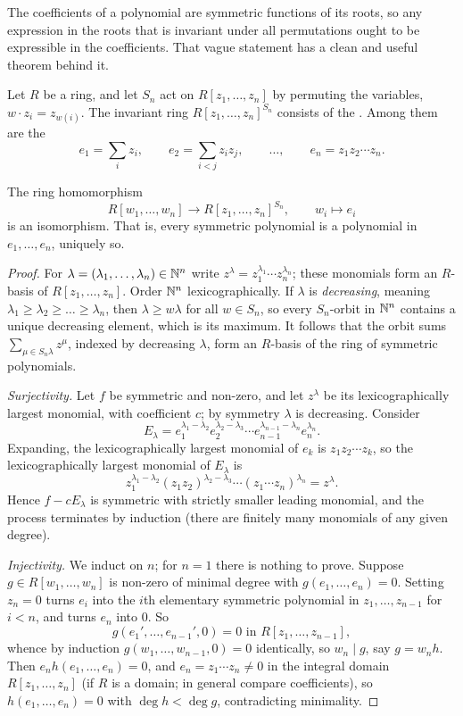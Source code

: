 \documentclass[a4paper]{scrartcl}
\begin{document}
The coefficients of a polynomial are symmetric functions of its roots, so any expression in the roots that is invariant under all permutations ought to be expressible in the coefficients. That vague statement has a clean and useful theorem behind it.

Let $R$ be a ring, and let $S_n$ act on $R[z_1,\dots,z_n]$ by permuting the variables, $w \cdot z_i = z_{w(i)}$. The invariant ring $R[z_1,\dots,z_n]^{S_n}$ consists of the . Among them are the 
$$e_1 = \sum_i z_i, \qquad e_2 = \sum_{i<j}z_iz_j, \qquad \dots, \qquad e_n = z_1z_2\cdots z_n.$$

\begin{theorem}\label{thm:symm}
	The ring homomorphism
	$$R[w_1,\dots,w_n] \to R[z_1,\dots,z_n]^{S_n}, \qquad w_i \mapsto e_i$$
	is an isomorphism. That is, every symmetric polynomial is a polynomial in $e_1,\dots,e_n$, uniquely so.
\end{theorem}

\begin{proof}
	For $\lambda = (\lambda_1,\dots,\lambda_n) \in \mathbb{N}^n$ write $z^\lambda = z_1^{\lambda_1}\cdots z_n^{\lambda_n}$; these monomials form an $R$-basis of $R[z_1,\dots,z_n]$. Order $\mathbb{N}^n$ lexicographically. If $\lambda$ is \emph{decreasing}, meaning $\lambda_1 \geq \lambda_2 \geq \dots \geq \lambda_n$, then $\lambda \geq w\lambda$ for all $w \in S_n$, so every $S_n$-orbit in $\mathbb{N}^n$ contains a unique decreasing element, which is its maximum. It follows that the orbit sums $\sum_{\mu \in S_n\lambda} z^\mu$, indexed by decreasing $\lambda$, form an $R$-basis of the ring of symmetric polynomials.

	\emph{Surjectivity.} Let $f$ be symmetric and non-zero, and let $z^\lambda$ be its lexicographically largest monomial, with coefficient $c$; by symmetry $\lambda$ is decreasing. Consider
	$$E_\lambda = e_1^{\lambda_1-\lambda_2}e_2^{\lambda_2-\lambda_3}\cdots e_{n-1}^{\lambda_{n-1}-\lambda_n}e_n^{\lambda_n}.$$
	Expanding, the lexicographically largest monomial of $e_k$ is $z_1z_2\cdots z_k$, so the lexicographically largest monomial of $E_\lambda$ is
	$$z_1^{\lambda_1-\lambda_2}(z_1z_2)^{\lambda_2-\lambda_3}\cdots(z_1\cdots z_n)^{\lambda_n} = z^\lambda.$$
	Hence $f - cE_\lambda$ is symmetric with strictly smaller leading monomial, and the process terminates by induction (there are finitely many monomials of any given degree).

	\emph{Injectivity.} We induct on $n$; for $n=1$ there is nothing to prove. Suppose $g \in R[w_1,\dots,w_n]$ is non-zero of minimal degree with $g(e_1,\dots,e_n) = 0$. Setting $z_n = 0$ turns $e_i$ into the $i$th elementary symmetric polynomial in $z_1,\dots,z_{n-1}$ for $i < n$, and turns $e_n$ into $0$. So
	$$g(e_1', \dots, e_{n-1}', 0) = 0 \text{ in } R[z_1,\dots,z_{n-1}],$$
	whence by induction $g(w_1,\dots,w_{n-1},0) = 0$ identically, so $w_n \mid g$, say $g = w_n h$. Then $e_n h(e_1,\dots,e_n) = 0$, and $e_n = z_1\cdots z_n \neq 0$ in the integral domain $R[z_1,\dots,z_n]$ (if $R$ is a domain; in general compare coefficients), so $h(e_1,\dots,e_n) = 0$ with $\deg h < \deg g$, contradicting minimality.
\end{proof}
\end{document}
